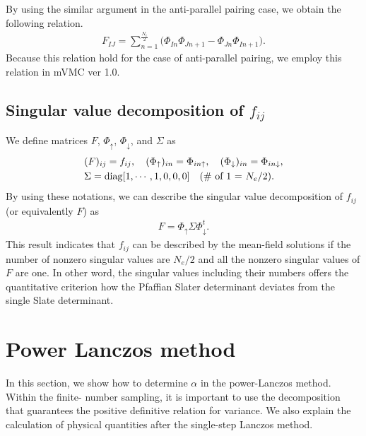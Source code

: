 By using the similar argument in the anti-parallel pairing case,
we obtain the following relation.
\begin{align}
F_{IJ}=\sum_{n=1}^{\frac{N_{e}}{2}}\Big(\Phi_{In}\Phi_{Jn+1}-\Phi_{Jn}\Phi_{In+1}\Big).
\end{align}
Because this relation hold for the case of anti-parallel pairing,
we employ this relation in mVMC ver 1.0.



\subsection{Singular value decomposition of $f_{ij}$}
We define matrices $F$, $\Phi_{\uparrow}$, $\Phi_{\downarrow}$, and $\Sigma$ as
\begin{align}
&(F)_{ij}=f_{ij},~~~ 
(\Phi_{\uparrow})_{in}=\Phi_{in\uparrow},~~~ 
(\Phi_{\downarrow})_{in}=\Phi_{in\downarrow}, \\
&\Sigma={\rm diag}[1,\cdots,1,0,0,0]~~~\text{({\rm \# of 1} = $N_{e}/2$)}.
\end{align}
By using these notations, we can describe the
singular value decomposition of $f_{ij}$ (or equivalently $F$) as 
\begin{align}
F=\Phi_{\uparrow}\Sigma\Phi_{\downarrow}^{t}.
\end{align}
This result indicates that $f_{ij}$ can be 
described by the mean-field solutions
if the number of
nonzero singular values are $N_{e}/2$ and
all the nonzero singular values of $F$ are one.
In other word, the singular values including their numbers
offers the quantitative criterion how the Pfaffian Slater determinant
deviates from the single Slate determinant.

\section{Power Lanczos method}
In this section, we show how to determine $\alpha$ in the power-Lanczos method. Within the finite- number sampling, it is important to use the decomposition that guarantees the positive definitive relation for variance. We also explain the calculation of physical quantities after the single-step Lanczos method.

